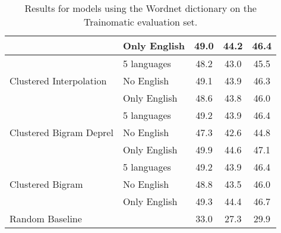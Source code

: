 \begin{table}[htbp]
\begin{tabular}{llccc}
                                                  & Only English & 49.0      & 44.2   & 46.4    \\
\hline
\multirow{3}{*}{ Clustered Interpolation }        & 5 languages  & 48.2      & 43.0   & 45.5    \\
                                                  & No English   & 49.1      & 43.9   & 46.3    \\
                                                  & Only English & 48.6      & 43.8   & 46.0    \\
\hline
\multirow{3}{*}{ Clustered Bigram Deprel
 }       & 5 languages  & 49.2      & 43.9   & 46.4    \\
                                                  & No English   & 47.3      & 42.6   & 44.8    \\
                                                  & Only English & 49.9      & 44.6   & 47.1    \\
\hline
\multirow{3}{*}{ Clustered Bigram }               & 5 languages  & 49.2      & 43.9   & 46.4    \\
                                                  & No English   & 48.8      & 43.5   & 46.0    \\
                                                  & Only English & 49.3      & 44.4   & 46.7    \\
\hline
\multirow{1}{*}{ Random Baseline }               &              & 33.0      & 27.3   & 29.9    \\
\end{tabular}

    \caption{Results for models using the Wordnet dictionary on the Trainomatic evaluation set.}
    \label{tab:wordnet_trainomatic}
\end{table}

